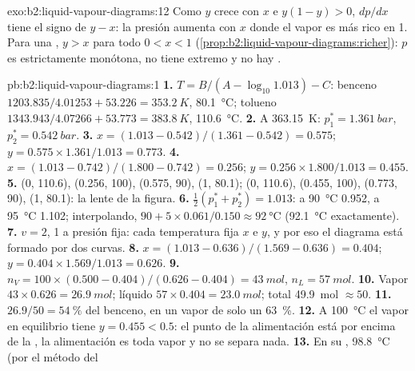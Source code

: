 \begin{solution}{exo:b2:liquid-vapour-diagrams:12}
Como $y$ crece con $x$ e $y(1 - y) > 0$, $dp/dx$ tiene el signo de $y - x$:
la presión aumenta con $x$ donde el vapor es más rico en 1. Para una , $y > x$ para todo $0 < x < 1$ (\cref{prop:b2:liquid-vapour-diagrams:richer}):
$p$ es estrictamente monótona, no tiene extremo y no hay .
\end{solution}

\begin{solution}{pb:b2:liquid-vapour-diagrams:1}
\textbf{1.} $T = B/(A - \log_{10}1.013) - C$: benceno $1203.835/4.01253 + 53.226 =
\qty{353.2}{K}$, \qty{80.1}{\degreeCelsius}; tolueno $1343.943/4.07266 + 53.773 =
\qty{383.8}{K}$, \qty{110.6}{\degreeCelsius}.
\textbf{2.} A \qty{363.15}{K}: $p_1^* = \qty{1.361}{bar}$, $p_2^* = \qty{0.542}{bar}$.
\textbf{3.} $x = (1.013 - 0.542)/(1.361 - 0.542) = 0.575$; $y = 0.575 \times
1.361/1.013 = 0.773$.
\textbf{4.} $x = (1.013 - 0.742)/(1.800 - 0.742) = 0.256$; $y = 0.256 \times
1.800/1.013 = 0.455$.
\textbf{5.}  (0, 110.6), (0.256, 100), (0.575, 90), (1, 80.1);  (0, 110.6), (0.455, 100), (0.773, 90), (1, 80.1): la lente de la
figura.
\textbf{6.} $\frac12(p_1^* + p_2^*) = 1.013$: a \qty{90}{\degreeCelsius} 0.952, a
\qty{95}{\degreeCelsius} 1.102; interpolando, $90 + 5 \times 0.061/0.150 \approx
\qty{92}{\degreeCelsius}$ (\qty{92.1}{\degreeCelsius} exactamente).
\textbf{7.} $v = 2$, 1 a presión fija: cada temperatura fija $x$ e $y$,
y por eso el diagrama está formado por dos curvas.
\textbf{8.} $x = (1.013 - 0.636)/(1.569 - 0.636) = 0.404$; $y = 0.404 \times
1.569/1.013 = 0.626$.
\textbf{9.} $n_V = 100 \times (0.500 - 0.404)/(0.626 - 0.404) = \qty{43}{mol}$,
$n_L = \qty{57}{mol}$.
\textbf{10.} Vapor $43 \times 0.626 = \qty{26.9}{mol}$; líquido $57 \times 0.404
= \qty{23.0}{mol}$; total \qty{49.9}{mol} $\approx 50$.
\textbf{11.} $26.9/50 = 54~\%$ del benceno, en un vapor de solo un 63~\%.
\textbf{12.} A \qty{100}{\degreeCelsius} el vapor en equilibrio tiene $y =
0.455 < 0.5$: el punto de la alimentación está por encima de la , la alimentación es toda
vapor y no se separa nada.
\textbf{13.} En su , \qty{98.8}{\degreeCelsius} (por el método del

\end{solution}
